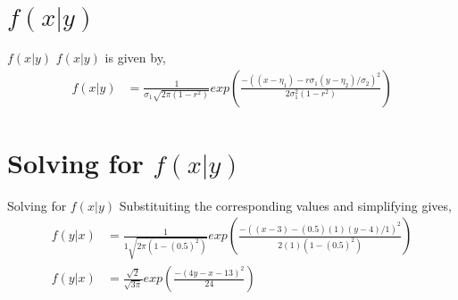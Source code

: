 \documentclass{beamer}
\providecommand{\brak}[1]{\ensuremath{\left(#1\right)}}
\begin{document}
\section{$f(x|y)$}
\begin{frame}{$f(x|y)$}
$f(x|y)$ is given by,
	\begin{align}
	        f(x|y) &= \frac{1}{\sigma _1\sqrt{2\pi(1-r^2)}}exp\brak{\frac{-((x-\eta_1)-r\sigma_1(y-\eta_2)/\sigma_2)^2}{2\sigma_1^2(1-r^2)}}
	\end{align}
\end{frame}


\section{Solving for $f(x|y)$}
\begin{frame}{Solving for $f(x|y)$}
Substituiting the corresponding values and simplifying gives,
	\begin{align}
	        f(y|x) &= \frac{1}{1\sqrt{2\pi(1-(0.5)^2)}}exp\brak{\frac{-((x-3)-(0.5)(1)(y-4)/1)^2}{2(1)(1-(0.5)^2)}} \\
	        f(y|x) &= \frac{\sqrt{2}}{\sqrt{3\pi}}exp\brak{\frac{-(4y-x-13)^2}{24}}
	\end{align}
\end{frame}
\end{document}
